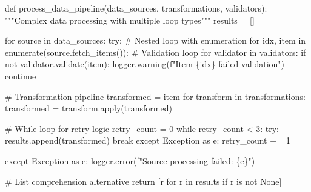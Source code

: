 \documentclass[
  letterpaper,
  DIV=11,
  numbers=noendperiod,
  oneside]{scrreprt}
\newenvironment{Shaded}{}{}
\newcommand{\BuiltInTok}[1]{\textcolor[rgb]{0.84,0.23,0.29}{#1}}
\newcommand{\CommentTok}[1]{\textcolor[rgb]{0.42,0.45,0.49}{#1}}
\newcommand{\ControlFlowTok}[1]{\textcolor[rgb]{0.84,0.23,0.29}{#1}}
\newcommand{\DecValTok}[1]{\textcolor[rgb]{0.00,0.36,0.77}{#1}}
\newcommand{\ImportTok}[1]{\textcolor[rgb]{0.01,0.18,0.38}{#1}}
\newcommand{\KeywordTok}[1]{\textcolor[rgb]{0.84,0.23,0.29}{#1}}
\newcommand{\NormalTok}[1]{\textcolor[rgb]{0.14,0.16,0.18}{#1}}
\newcommand{\OperatorTok}[1]{\textcolor[rgb]{0.14,0.16,0.18}{#1}}
\newcommand{\PreprocessorTok}[1]{\textcolor[rgb]{0.84,0.23,0.29}{#1}}
\newcommand{\SpecialCharTok}[1]{\textcolor[rgb]{0.00,0.36,0.77}{#1}}
\newcommand{\SpecialStringTok}[1]{\textcolor[rgb]{0.01,0.18,0.38}{#1}}
\newcommand{\VariableTok}[1]{\textcolor[rgb]{0.89,0.38,0.04}{#1}}
\begin{document}
\begin{Shaded}
\begin{Highlighting}[]
\KeywordTok{def}\NormalTok{ process\_data\_pipeline(data\_sources, transformations, validators):}
    \CommentTok{"""Complex data processing with multiple loop types"""}
\NormalTok{    results }\OperatorTok{=}\NormalTok{ []}
    
    \ControlFlowTok{for}\NormalTok{ source }\KeywordTok{in}\NormalTok{ data\_sources:}
        \ControlFlowTok{try}\NormalTok{:}
            \CommentTok{\# Nested loop with enumeration}
            \ControlFlowTok{for}\NormalTok{ idx, item }\KeywordTok{in} \BuiltInTok{enumerate}\NormalTok{(source.fetch\_items()):}
                \CommentTok{\# Validation loop}
                \ControlFlowTok{for}\NormalTok{ validator }\KeywordTok{in}\NormalTok{ validators:}
                    \ControlFlowTok{if} \KeywordTok{not}\NormalTok{ validator.validate(item):}
\NormalTok{                        logger.warning(}\SpecialStringTok{f"Item }\SpecialCharTok{\{}\NormalTok{idx}\SpecialCharTok{\}}\SpecialStringTok{ failed validation"}\NormalTok{)}
                        \ControlFlowTok{continue}
                        
                \CommentTok{\# Transformation pipeline}
\NormalTok{                transformed }\OperatorTok{=}\NormalTok{ item}
                \ControlFlowTok{for}\NormalTok{ transform }\KeywordTok{in}\NormalTok{ transformations:}
\NormalTok{                    transformed }\OperatorTok{=}\NormalTok{ transform.}\BuiltInTok{apply}\NormalTok{(transformed)}
                
                \CommentTok{\# While loop for retry logic}
\NormalTok{                retry\_count }\OperatorTok{=} \DecValTok{0}
                \ControlFlowTok{while}\NormalTok{ retry\_count }\OperatorTok{\textless{}} \DecValTok{3}\NormalTok{:}
                    \ControlFlowTok{try}\NormalTok{:}
\NormalTok{                        results.append(transformed)}
                        \ControlFlowTok{break}
                    \ControlFlowTok{except} \PreprocessorTok{Exception} \ImportTok{as}\NormalTok{ e:}
\NormalTok{                        retry\_count }\OperatorTok{+=} \DecValTok{1}
                        
        \ControlFlowTok{except} \PreprocessorTok{Exception} \ImportTok{as}\NormalTok{ e:}
\NormalTok{            logger.error(}\SpecialStringTok{f"Source processing failed: }\SpecialCharTok{\{}\NormalTok{e}\SpecialCharTok{\}}\SpecialStringTok{"}\NormalTok{)}
            
    \CommentTok{\# List comprehension alternative}
    \ControlFlowTok{return}\NormalTok{ [r }\ControlFlowTok{for}\NormalTok{ r }\KeywordTok{in}\NormalTok{ results }\ControlFlowTok{if}\NormalTok{ r }\KeywordTok{is} \KeywordTok{not} \VariableTok{None}\NormalTok{]}
\end{Highlighting}
\end{Shaded}
\end{document}
